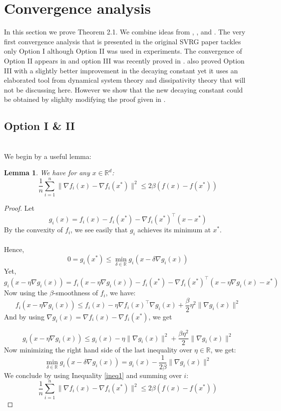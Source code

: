 \documentclass[12pt]{report}
\newtheorem{lemma}{Lemma}[section]
\newcounter{theo}[section]
\begin{document}
\section{Convergence analysis}
In this section we prove Theorem 2.1. We combine ideas from \cite{johnson2013accelerating}, \cite{bubeck2015convex},  \cite{hu2018dissipativity} and \cite{tan2016barzilai}. 
The very first convergence analysis that is presented in the original SVRG paper \cite{johnson2013accelerating} tackles only Option I although Option II was used in experiments. The convergence of Option II appears in \cite{bubeck2015convex} and option III was recently proved in \cite{tan2016barzilai}. \cite{hu2018dissipativity} also proved Option III with a slightly better improvement in the decaying constant yet it uses an elaborated tool from dynamical system theory and dissipativity theory that will not be discussing here. However we show that the new decaying constant could be obtained by slighlty modifying the proof given in \cite{tan2016barzilai}.


\subsection{Option I \& II}

\\We begin by a useful lemma:
\begin{lemma}\label{lemma1}
We have for any $x\in\mathbb{R}^d$:
$$\frac{1}{n}\sum_{i=1}^n\|\nabla f_i(x)-\nabla f_i(x^*)\|^2\leq 2\beta(f(x)-f(x^*))$$
\end{lemma}

\begin{proof}
Let 
$$g_i(x)=f_i(x)-f_i(x^*)-\nabla f_i(x^*)^\top(x-x^*)$$
By the convexity of $f_i$, we see easily that $g_i$ achieves its minimum at $x^*$.\\
\\Hence, 
\begin{equation}\label{ineq1}
0=g_i(x^*)\leq \min_{\delta\in\mathbb{R}} g_i\left(x-\delta\nabla g_i(x)\right)
\end{equation}
Yet, $g_i\left(x-\eta\nabla g_i(x)\right)=f_i(x-\eta\nabla g_i(x))-f_i(x^*)-\nabla f_i(x^*)^\top(x-\eta\nabla g_i(x)-x^*)$\\

Now using the $\beta$-smoothness of $f_i$, we have:
$$f_i\left(x-\eta\nabla g_i(x)\right)\leq f_i(x) -\eta\nabla f_i(x)^\top\nabla g_i(x)+\frac{\beta}{2}\eta^2\|\nabla g_i(x)\|^2$$
And by using  
$\nabla g_i(x)=\nabla f_i(x)-\nabla f_i(x^*) $, we get

$$g_i\left(x-\eta\nabla g_i(x)\right)\leq g_i(x)-\eta\|\nabla g_i(x) \|^2+\frac{\beta\eta^2}{2}\|\nabla g_i(x)\|^2 $$
Now minimizing the right hand side of the last inequality over $\eta\in\mathbb{R}$, we get:
$$ \min_{\delta\in\mathbb{R}} g_i\left(x-\delta\nabla g_i(x)\right)=g_i(x)-\frac{1}{2\beta}\|\nabla g_i(x)\|^2$$
We conclude by using Inequality \ref{ineq1} and summing over $i$:
$$\frac{1}{n}\sum_{i=1}^n\|\nabla f_i(x)-\nabla f_i(x^*)\|^2\leq 2\beta(f(x)-f(x^*))$$
\end{proof}
\end{document}
